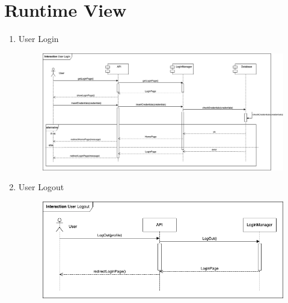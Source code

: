 \newpage
\section{Runtime View}

\begin{enumerate}
    
    \item User Login
    \begin{figure}[h!]
            \centering  \includegraphics[width=1\textwidth]{DD/Images/Interactions/INT01_UserLogin.drawio.png}
            \label{fig:ComponentViewDiagram}
    \end{figure}
    
    \newpage
    \item User Logout
    \begin{figure}[h!]
            \centering  \includegraphics[width=1\textwidth]{DD/Images/Interactions/INT02_UserLogout.drawio.png}
            \label{fig:ComponentViewDiagram}
    \end{figure}


\end{enumerate}
